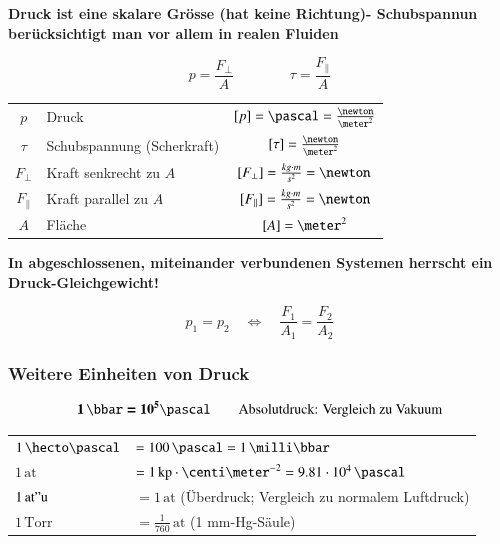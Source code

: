 \textbf{Druck ist eine skalare Grösse (hat keine Richtung)- Schubspannun berücksichtigt man vor allem in realen Fluiden} 

$$\boxed{ p = \frac{F_{\perp}}{A} } \qquad \qquad \boxed{ \tau = \frac{F_{\parallel}}{A} } $$

\begin{tabular}{c l c}
    $p$             & Druck                         & $[p] = \pascal = \frac{\newton}{\meter^2}$    \\
    $\tau$          & Schubspannung (Scherkraft)    & $[\tau] = \frac{\newton}{\meter^2}$                            \\
    $F_{\perp}$     & Kraft senkrecht zu $A$        & $[F_{\perp}] = \frac{kg \cdot m}{s^2} =\newton$                       \\
    $F_{\parallel}$ & Kraft parallel zu $A$         & $[F_{\parallel}] = \frac{kg \cdot m}{s^2} = \newton$                   \\
    $A$             & Fläche                        & $[A] = \meter^2$
\end{tabular}

\medskip

\textbf{In abgeschlossenen, miteinander verbundenen Systemen herrscht ein Druck-Gleichgewicht!} 

$$ \boxed{ p_1 = p_2  \quad \Leftrightarrow  \quad \frac{F_1}{A_1} = \frac{F_2}{A_2} }$$



\subsubsection{Weitere Einheiten von Druck}

\vspace{-0.2cm}
$$ \bm{1 \, \bbar = 10^5 \pascal} \qquad \text{Absolutdruck: Vergleich zu Vakuum} $$

\begin{tabular}{ll}
    $1 \, \hecto \pascal$   & $= 100 \, \pascal = 1 \, \milli \bbar $                                       \\
    $1 \, \mathrm{at}$      & $= 1 \, \mathrm{kp \cdot \centi \meter^{-2}} = 9.81 \cdot 10^4 \, \pascal$    \\
    $1 \, \mathrm{at"u}$    & $= 1 \, \mathrm{at}$ (Überdruck; Vergleich zu normalem Luftdruck)             \\
    $1 \, \mathrm{Torr}$    & $= \frac{1}{760} \, \mathrm{at}$ (1 mm-Hg-Säule)
\end{tabular}


